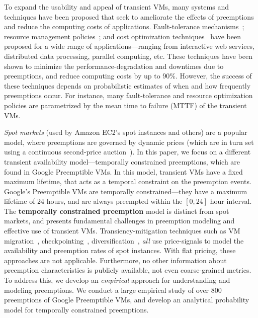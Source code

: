 To expand the usability and appeal of transient VMs, many systems and techniques have been proposed that seek to ameliorate the effects of preemptions and reduce the computing costs of applications. 
Fault-tolerance mechanisms~\cite{spotcheck, marathe2014exploiting}; resource management policies~\cite{exosphere, conductor}; and cost optimization techniques~\cite{dubois2016optispot, shastri2017hotspot} have been proposed for a wide range of applications---ranging from interactive web services, distributed data processing, parallel computing, etc.
These techniques have been shown to minimize the performance-degradation and downtimes due to preemptions, and reduce computing costs by up to 90\%. 
However, the success of these techniques depends on probabilistic estimates of when and how frequently preemptions occur. 
For instance, many fault-tolerance and resource optimization policies are parametrized by the mean time to failure (MTTF) of the transient VMs.



\emph{Spot markets} (used by Amazon EC2's spot instances and others) are a popular model, where preemptions are governed by dynamic prices (which are in turn set using a continuous second-price auction~\cite{spot-pricing2}). 
In this paper, we focus on a different transient availability model---temporally constrained preemptions, which are found in Google Preemptible VMs. 
In this model, transient VMs have a fixed maximum lifetime, that acts as a temporal constraint on the preemption events. 
Google's Preemptible VMs are temporally constrained---they have a maximum lifetime of 24 hours, and are always preempted within the $[0,24]$ hour interval.
%
The \textbf{temporally constrained preemption} model is distinct from spot markets, and presents fundamental challenges in preemption modeling and effective use of transient VMs. 
Transiency-mitigation techniques such as VM migration~\cite{spotcheck}, checkpointing~\cite{flint, marathe2014exploiting}, diversification~\cite{exosphere}, \emph{all} use price-signals to model the availability and preemption rates of spot instances. 
With flat pricing, these approaches are not applicable. 
Furthermore, no other information about preemption characteristics is publicly available, not even coarse-grained metrics. 
To address this, we develop an \emph{empirical} approach for understanding and modeling preemptions. 
We conduct a large empirical study of over 800 preemptions of Google Preemptible VMs, and develop an analytical probability model for temporally constrained preemptions. 



